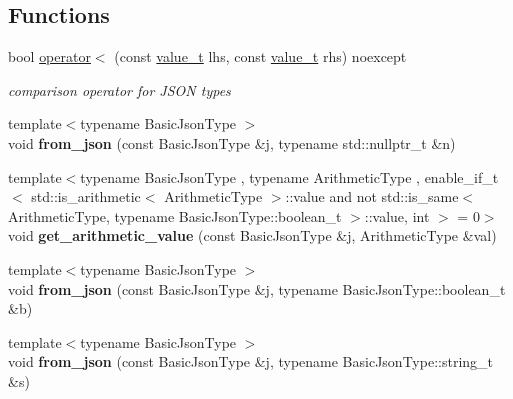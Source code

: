 \subsection*{Functions}
\begin{DoxyCompactItemize}
\item 
bool \hyperlink{namespacenlohmann_1_1detail_a09169efff3bd1771fff29bd92cea19e0}{operator$<$} (const \hyperlink{namespacenlohmann_1_1detail_a1ed8fc6239da25abcaf681d30ace4985}{value\+\_\+t} lhs, const \hyperlink{namespacenlohmann_1_1detail_a1ed8fc6239da25abcaf681d30ace4985}{value\+\_\+t} rhs) noexcept
\begin{DoxyCompactList}\small\item\em comparison operator for J\+S\+ON types \end{DoxyCompactList}\item 
\mbox{\label{namespacenlohmann_1_1detail_a1f0395aad0fe853a4539288749d3a603}} 
{\footnotesize template$<$typename Basic\+Json\+Type $>$ }\\void {\bfseries from\+\_\+json} (const Basic\+Json\+Type \&j, typename std\+::nullptr\+\_\+t \&n)
\item 
\mbox{\label{namespacenlohmann_1_1detail_a85955b9c6dd31846e4b8e891f78614b6}} 
{\footnotesize template$<$typename Basic\+Json\+Type , typename Arithmetic\+Type , enable\+\_\+if\+\_\+t$<$ std\+::is\+\_\+arithmetic$<$ Arithmetic\+Type $>$\+::value and not std\+::is\+\_\+same$<$ Arithmetic\+Type, typename Basic\+Json\+Type\+::boolean\+\_\+t $>$\+::value, int $>$  = 0$>$ }\\void {\bfseries get\+\_\+arithmetic\+\_\+value} (const Basic\+Json\+Type \&j, Arithmetic\+Type \&val)
\item 
\mbox{\label{namespacenlohmann_1_1detail_a58117f225f43d03e3a0a4a6f3d77c9d9}} 
{\footnotesize template$<$typename Basic\+Json\+Type $>$ }\\void {\bfseries from\+\_\+json} (const Basic\+Json\+Type \&j, typename Basic\+Json\+Type\+::boolean\+\_\+t \&b)
\item 
\mbox{\label{namespacenlohmann_1_1detail_ad74d89f77ada7a57eff38b43d4bf2335}} 
{\footnotesize template$<$typename Basic\+Json\+Type $>$ }\\void {\bfseries from\+\_\+json} (const Basic\+Json\+Type \&j, typename Basic\+Json\+Type\+::string\+\_\+t \&s)

\end{DoxyCompactItemize}

